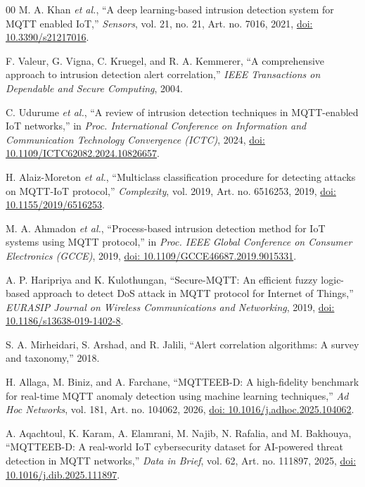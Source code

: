 \documentclass[conference]{IEEEtran}
\begin{document}
\begin{thebibliography}{00}
M. A. Khan \emph{et al.},
``A deep learning-based intrusion detection system for MQTT enabled
IoT,'' \emph{Sensors}, vol. 21, no. 21, Art. no. 7016, 2021,
\href{https://doi.org/10.3390/s21217016}{doi: 10.3390/s21217016}.

F. Valeur, G. Vigna, C. Kruegel, and R. A. Kemmerer,
``A comprehensive approach to intrusion detection alert correlation,''
\textit{IEEE Transactions on Dependable and Secure Computing},
2004.

C. Udurume \textit{et al.},
``A review of intrusion detection techniques in MQTT-enabled IoT networks,''
in \textit{Proc. International Conference on Information and
Communication Technology Convergence (ICTC)},
2024,
\href{https://doi.org/10.1109/ICTC62082.2024.10826657}{doi: 10.1109/ICTC62082.2024.10826657}.

H. Alaiz-Moreton \emph{et al.},
``Multiclass classification procedure for detecting attacks on MQTT-IoT
protocol,'' \emph{Complexity}, vol. 2019, Art. no. 6516253,
2019, \href{https://doi.org/10.1155/2019/6516253}{doi: 10.1155/2019/6516253}.

M. A. Ahmadon \textit{et al.},
``Process-based intrusion detection method for IoT systems using MQTT
protocol,''
in \textit{Proc. IEEE Global Conference on Consumer Electronics
(GCCE)},
2019,
\href{https://doi.org/10.1109/GCCE46687.2019.9015331}{doi: 10.1109/GCCE46687.2019.9015331}.

A. P. Haripriya and K. Kulothungan,
``Secure-MQTT: An efficient fuzzy logic-based approach to detect DoS
attack in MQTT protocol for Internet of Things,''
\textit{EURASIP Journal on Wireless Communications and Networking},
2019,
\href{https://doi.org/10.1186/s13638-019-1402-8}{doi: 10.1186/s13638-019-1402-8}.

S. A. Mirheidari, S. Arshad, and R. Jalili,
``Alert correlation algorithms: A survey and taxonomy,''
2018.

H. Allaga, M. Biniz, and A. Farchane,
``MQTTEEB-D: A high-fidelity benchmark for real-time MQTT anomaly detection
using machine learning techniques,'' \emph{Ad Hoc Networks}, vol. 181,
Art. no. 104062, 2026, \href{https://doi.org/10.1016/j.adhoc.2025.104062}{doi: 10.1016/j.adhoc.2025.104062}.

A. Aqachtoul, K. Karam, A. Elamrani, M. Najib, N. Rafalia,
and M. Bakhouya, ``MQTTEEB-D: A real-world IoT cybersecurity dataset
for AI-powered threat detection in MQTT networks,''
\emph{Data in Brief}, vol. 62, Art. no. 111897, 2025,
\href{https://doi.org/10.1016/j.dib.2025.111897}{doi: 10.1016/j.dib.2025.111897}.


\end{thebibliography}
\end{document}
